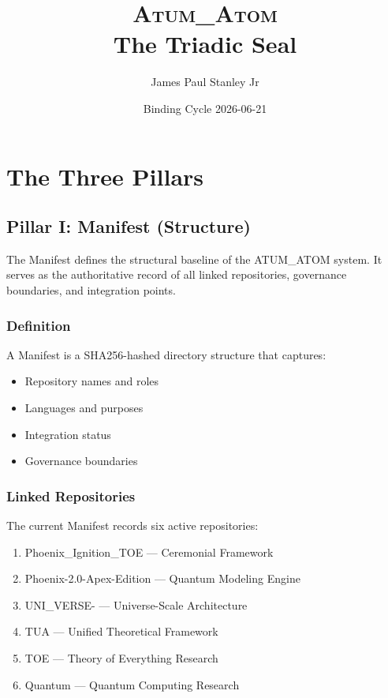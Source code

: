 \documentclass[12pt,twoside]{book}
\title{\textsc{Atum\_Atom}\\The Triadic Seal}
\author{James Paul Stanley Jr}
\date{Binding Cycle 2026-06-21}
\begin{document}
\maketitle

\tableofcontents
\newpage


\chapter{The Three Pillars}

\section{Pillar I: Manifest (Structure)}

The Manifest defines the structural baseline of the ATUM\_ATOM system.
It serves as the authoritative record of all linked repositories,
governance boundaries, and integration points.

\subsection{Definition}

A Manifest is a SHA256-hashed directory structure that captures:
\begin{itemize}
  \item Repository names and roles
  \item Languages and purposes
  \item Integration status
  \item Governance boundaries
\end{itemize}

\subsection{Linked Repositories}

The current Manifest records six active repositories:

\begin{enumerate}
  \item Phoenix\_Ignition\_TOE — Ceremonial Framework
  \item Phoenix-2.0-Apex-Edition — Quantum Modeling Engine
  \item UNI\_VERSE- — Universe-Scale Architecture
  \item TUA — Unified Theoretical Framework
  \item TOE — Theory of Everything Research
  \item Quantum — Quantum Computing Research
\end{enumerate}
\end{document}
